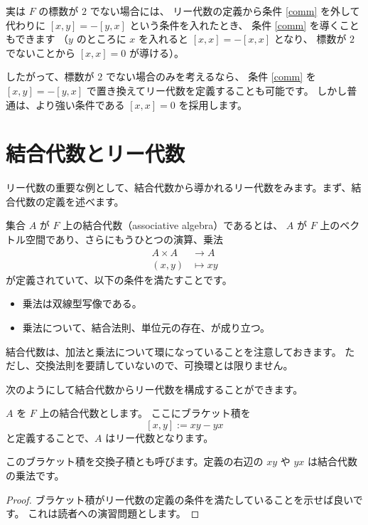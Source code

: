 \documentclass{ltjsarticle}
\begin{document}
実は $F$ の標数が $2$ でない場合には、
リー代数の定義から条件 \ref{comm} を外して代わりに $[x, y] = -[y, x]$ という条件を入れたとき、
条件 \ref{comm} を導くこともできます
（$y$ のところに $x$ を入れると $[x, x] = -[x, x]$ となり、
標数が $2$ でないことから $[x, x] = 0$ が導ける）。

したがって、標数が $2$ でない場合のみを考えるなら、
条件 \ref{comm} を $[x, y] = -[y, x]$ で置き換えてリー代数を定義することも可能です。
しかし普通は、より強い条件である $[x, x] = 0$ を採用します。

\section{結合代数とリー代数}

リー代数の重要な例として、結合代数から導かれるリー代数をみます。まず、結合代数の定義を述べます。

\begin{definition}[結合代数]
    集合 $A$ が $F$ 上の結合代数（associative algebra）であるとは、
    $A$ が $F$ 上のベクトル空間であり、さらにもうひとつの演算、乗法
    \begin{align*}
        A \times A & \to A      \\
        (x, y)     & \mapsto xy
    \end{align*}
    が定義されていて、以下の条件を満たすことです。
    \begin{itemize}
        \item 乗法は双線型写像である。
        \item 乗法について、結合法則、単位元の存在、が成り立つ。
    \end{itemize}
\end{definition}

結合代数は、加法と乗法について環になっていることを注意しておきます。
ただし、交換法則を要請していないので、可換環とは限りません。

次のようにして結合代数からリー代数を構成することができます。

\begin{example}[結合代数から導かれるリー代数]\label{commutator}
    $A$ を $F$ 上の結合代数とします。
    ここにブラケット積を
    \[
        [x, y] := xy - yx
    \]
    と定義することで、$A$ はリー代数となります。
\end{example}

このブラケット積を交換子積とも呼びます。定義の右辺の $xy$ や $yx$ は結合代数の乗法です。

\begin{proof}
    ブラケット積がリー代数の定義の条件を満たしていることを示せば良いです。
    これは読者への演習問題とします。
\end{proof}
\end{document}
